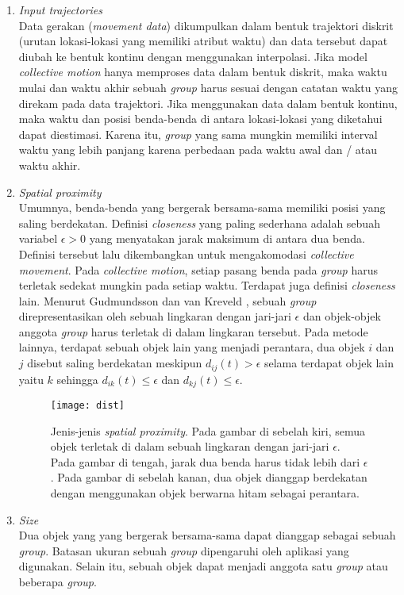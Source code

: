 \begin{enumerate}
\item \textit{Input trajectories}\\
Data gerakan (\textit{movement data}) dikumpulkan dalam bentuk trajektori diskrit (urutan lokasi-lokasi yang memiliki atribut waktu) dan data tersebut dapat diubah ke bentuk kontinu dengan menggunakan interpolasi. Jika model \textit{collective motion} hanya memproses data dalam bentuk diskrit, maka waktu mulai dan waktu akhir sebuah \textit{group} harus sesuai dengan catatan waktu yang direkam pada data trajektori. Jika menggunakan data dalam bentuk kontinu, maka waktu dan posisi benda-benda di antara lokasi-lokasi yang diketahui dapat diestimasi. Karena itu, \textit{group} yang sama mungkin memiliki interval waktu yang lebih panjang karena perbedaan pada waktu awal dan / atau waktu akhir.

\item \textit{Spatial proximity}\\
Umumnya, benda-benda yang bergerak bersama-sama memiliki posisi yang saling berdekatan. Definisi \textit{closeness} yang paling sederhana adalah sebuah variabel $\epsilon > 0$ yang menyatakan jarak maksimum di antara dua benda. Definisi tersebut lalu dikembangkan untuk mengakomodasi \textit{collective movement}. Pada \textit{collective motion}, setiap pasang benda pada \textit{group} harus terletak sedekat mungkin pada setiap waktu. Terdapat juga definisi \textit{closeness} lain. Menurut Gudmundsson dan van Kreveld \cite{flock_pattern_2:06}, sebuah \textit{group} direpresentasikan oleh sebuah lingkaran dengan jari-jari $\epsilon$ dan objek-objek anggota \textit{group} harus terletak di dalam lingkaran tersebut. Pada metode lainnya, terdapat sebuah objek lain yang menjadi perantara, dua objek $i$ dan $j$ disebut saling berdekatan meskipun $d_{ij}(t) > \epsilon$ selama terdapat objek lain yaitu $k$ sehingga $d_{ik}(t)\leq \epsilon$ dan $d_{kj}(t)\leq \epsilon$.
\begin{figure}[h]
	\centering  
	\texttt{[image: dist]}  
	\caption{Jenis-jenis \textit{spatial proximity}. Pada gambar di sebelah kiri, semua objek terletak di dalam sebuah lingkaran dengan jari-jari $\epsilon$. Pada gambar di tengah, jarak dua benda harus tidak lebih dari $\epsilon$. Pada gambar di sebelah kanan, dua objek dianggap berdekatan dengan menggunakan objek berwarna hitam sebagai perantara.} 
	\label{fig:dist} 
\end{figure}

\item \textit{Size}\\
Dua objek yang yang bergerak bersama-sama dapat dianggap sebagai sebuah \textit{group}. Batasan ukuran sebuah \textit{group} dipengaruhi oleh aplikasi yang  digunakan. Selain itu, sebuah objek dapat menjadi anggota satu \textit{group} atau beberapa \textit{group}.


\end{enumerate}
